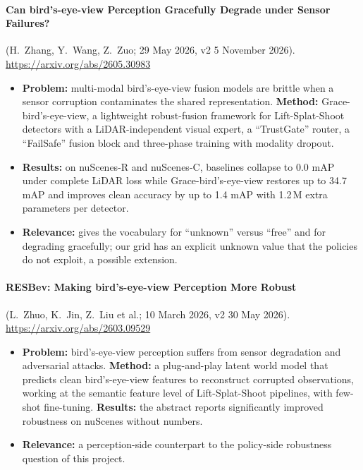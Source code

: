 \paragraph{Can bird's-eye-view Perception Gracefully Degrade under Sensor Failures?} (H.~Zhang, Y.~Wang, Z.~Zuo; 29 May 2026, v2 5 November 2026). \url{https://arxiv.org/abs/2605.30983}
\begin{itemize}
\item \textbf{Problem:} multi-modal bird's-eye-view fusion models are brittle when a sensor corruption contaminates the shared representation. \textbf{Method:} Grace-bird's-eye-view, a lightweight robust-fusion framework for Lift-Splat-Shoot detectors with a LiDAR-independent visual expert, a ``TrustGate'' router, a ``FailSafe'' fusion block and three-phase training with modality dropout.
\item \textbf{Results:} on nuScenes-R and nuScenes-C, baselines collapse to 0.0 mAP under complete LiDAR loss while Grace-bird's-eye-view restores up to 34.7 mAP and improves clean accuracy by up to 1.4 mAP with 1.2\,M extra parameters per detector.
\item \textbf{Relevance:} gives the vocabulary for ``unknown'' versus ``free'' and for degrading gracefully; our grid has an explicit unknown value that the policies do not exploit, a possible extension.
\end{itemize}

\paragraph{RESBev: Making bird's-eye-view Perception More Robust} (L.~Zhuo, K.~Jin, Z.~Liu et al.; 10 March 2026, v2 30 May 2026). \url{https://arxiv.org/abs/2603.09529}
\begin{itemize}
\item \textbf{Problem:} bird's-eye-view perception suffers from sensor degradation and adversarial attacks. \textbf{Method:} a plug-and-play latent world model that predicts clean bird's-eye-view features to reconstruct corrupted observations, working at the semantic feature level of Lift-Splat-Shoot pipelines, with few-shot fine-tuning. \textbf{Results:} the abstract reports significantly improved robustness on nuScenes without numbers.
\item \textbf{Relevance:} a perception-side counterpart to the policy-side robustness question of this project.
\end{itemize}

